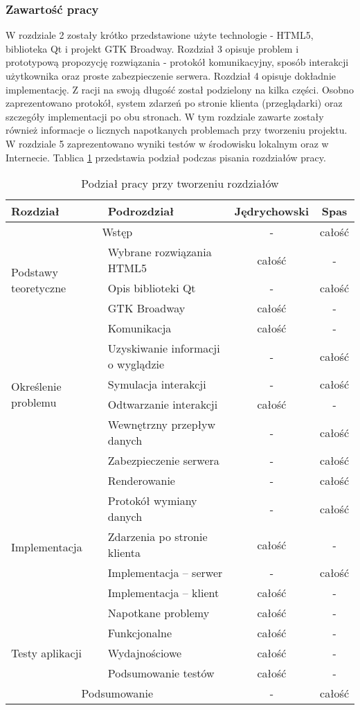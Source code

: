 \subsubsection{Zawartość pracy}

W rozdziale 2 zostały krótko przedstawione użyte technologie - HTML5, biblioteka Qt i projekt GTK Broadway. Rozdział 3 opisuje problem i prototypową propozycję rozwiązania - protokół komunikacyjny, sposób interakcji użytkownika oraz proste zabezpieczenie serwera. Rozdział 4 opisuje dokładnie implementację. Z racji na swoją długość został podzielony na kilka części. Osobno zaprezentowano protokół, system zdarzeń po stronie klienta (przeglądarki) oraz szczegóły implementacji po obu stronach. W tym rozdziale zawarte zostały również informacje o licznych napotkanych problemach przy tworzeniu projektu. W rozdziale 5 zaprezentowano wyniki testów w środowisku lokalnym oraz w Internecie.
Tablica \ref{tab:podzial} przedstawia podział podczas pisania rozdziałów pracy.

\begin{table}[H]
\centering  
\begin{tabular}{ |l|l|c|c|}
\hline
Rozdział & Podrozdział              & Jędrychowski & Spas   \\
\hline
\multicolumn{2}{|c|}{Wstęp} & - & całość \\
\hline 
\multirow{3}{*}{Podstawy teoretyczne} & Wybrane rozwiązania HTML5 & całość & -  \\
 & Opis biblioteki Qt & - & całość  \\
 & GTK Broadway & całość & -  \\
 \hline
 \multirow{6}{*}{Określenie problemu} & Komunikacja & całość & -  \\
  & Uzyskiwanie informacji o wyglądzie & - & całość  \\
  & Symulacja interakcji & - & całość  \\
  & Odtwarzanie interakcji& całość & -  \\
  & Wewnętrzny przepływ danych & - & całość  \\
  & Zabezpieczenie serwera & - & całość  \\
  \hline
  \multirow{6}{*}{Implementacja} & Renderowanie & - & całość  \\
   & Protokół wymiany danych & - & całość  \\
   & Zdarzenia po stronie klienta & całość & -  \\
   & Implementacja -- serwer & - & całość  \\
   & Implementacja -- klient & całość & -  \\
   & Napotkane problemy & całość & -  \\
   \hline
   \multirow{3}{*}{Testy aplikacji} & Funkcjonalne & całość & -  \\
     & Wydajnościowe & całość & -  \\
     & Podsumowanie testów & całość & -  \\
   \hline
   \multicolumn{2}{|c|}{Podsumowanie} & - & całość \\
   \hline

\end{tabular}
\caption{Podział pracy przy tworzeniu rozdziałów}
\label{tab:podzial}
\end{table}